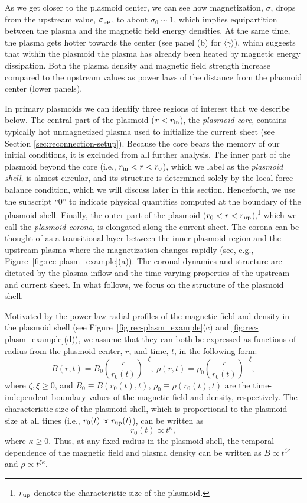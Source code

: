 As we get closer to the plasmoid center, we can see how magnetization, $\sigma$, drops from the upstream value, $\sigma_{\rm up}$, to about $\sigma_0\sim 1$, which implies equipartition between the plasma and the magnetic field energy densities. At the same time, the plasma gets hotter towards the center (see panel (b) for $\langle\gamma\rangle$), which suggests that within the plasmoid the plasma has already been heated by magnetic energy dissipation. Both the plasma density and magnetic field strength increase compared to the upstream values as power laws of the distance from the plasmoid center (lower panels).

In primary plasmoids we can identify three regions of interest that we describe below. The central part of the plasmoid ($r < r_{\rm in}$), the {\it plasmoid core}, contains typically hot unmagnetized plasma used to initialize the current sheet (see Section \ref{sec:reconnection-setup}). Because the core bears the memory of our initial conditions, it is excluded from all further analysis. The inner part of the plasmoid beyond the core (i.e., $r_{\rm in} < r < r_0$), which we label as the {\it plasmoid shell}, is almost circular, and its structure is determined solely by the local force balance condition, which we will discuss later in this section. Henceforth, we use the subscript ``$0$'' to indicate physical quantities computed at the boundary of the plasmoid shell. Finally, the outer part of the plasmoid ($r_0 < r < r_{\rm up}$),\footnote{$r_{\rm up}$ denotes the characteristic size of the plasmoid.} which we call the {\it plasmoid corona}, is elongated along the current sheet. The corona can be thought of as a transitional layer between the inner plasmoid region and the upstream plasma where the magnetization changes rapidly (see, e.g., Figure~\ref{fig:rec-plasm_example}(a)). The coronal dynamics and structure are dictated by the plasma inflow and the time-varying properties of the upstream and current sheet. In what follows, we focus on the structure of the plasmoid shell.

Motivated by the power-law radial profiles of the magnetic field and density in the plasmoid shell (see Figure~\ref{fig:rec-plasm_example}(c) and \ref{fig:rec-plasm_example}(d)), we assume that they can both be expressed as functions of radius from the plasmoid center, $r$, and time, $t$, in the following form:
\begin{equation}
    \label{eq:radialstruct}
    B(r,t)=B_0\left(\frac{r}{r_0(t)}\right)^{-\zeta},~\rho(r,t)=\rho_0\left(\frac{r}{r_0(t)}\right)^{-\xi},
\end{equation}
where $\zeta, \xi \ge 0$, and $B_0\equiv B(r_0(t), t)$, $\rho_0\equiv \rho(r_0(t), t)$ are the time-independent boundary values of the magnetic field and density, respectively. The characteristic size of the plasmoid shell, which is proportional to the plasmoid size at all times (i.e., $r_0(t)\propto r_{\rm up}(t)$), can be written as
\begin{equation}
    \label{eq:inflationrate}
    r_0(t)\propto t^\kappa,
\end{equation}
where $\kappa\ge 0$. 
Thus, at any fixed radius in the plasmoid shell, the temporal dependence of the magnetic field and plasma density can be written as $B\propto t^{\zeta\kappa}$ and $\rho\propto t^{\xi\kappa}$.


